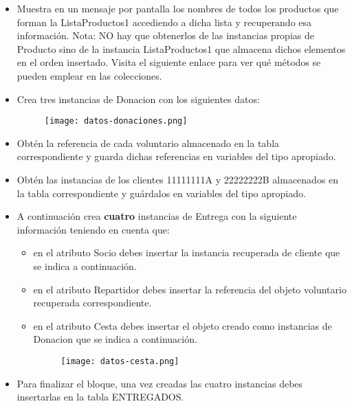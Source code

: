 \begin{enumerate}[label=\alph*)]
\begin{itemize}
        \item Muestra en un mensaje por pantalla los nombres de todos los productos que forman la ListaProductos1 accediendo a dicha lista y recuperando esa información. Nota: NO hay que obtenerlos de las instancias propias de Producto sino de la instancia ListaProductos1 que almacena dichos elementos en el orden insertado. Visita el siguiente enlace para ver qué métodos se pueden emplear en las colecciones.

        \item Crea tres instancias de Donacion con los siguientes datos:

    \begin{figure}[H]
    \centering
    \texttt{[image: datos-donaciones.png]}
    \end{figure}

    \item Obtén la referencia de cada voluntario almacenado en la tabla correspondiente y guarda dichas referencias en variables del tipo apropiado.
    \item Obtén las instancias de los clientes 11111111A y 22222222B almacenados en la tabla correspondiente y guárdalos en variables del tipo apropiado.
    \item A continuación crea \textbf{cuatro} instancias de Entrega con la siguiente información teniendo en cuenta que:
    \begin{itemize}
        \item en el atributo  Socio debes insertar la instancia recuperada de cliente que se indica a continuación.
        \item en el atributo Repartidor debes insertar la referencia del objeto voluntario recuperada correspondiente.
        \item en el atributo Cesta debes insertar el objeto creado como instancias de Donacion que se indica a continuación.

        \begin{figure}[H]
            \centering
            \texttt{[image: datos-cesta.png]}
        \end{figure}
    \end{itemize}

      \item Para finalizar el bloque, una vez creadas las cuatro instancias debes insertarlas en la tabla ENTREGADOS.
    \end{itemize}
\end{enumerate}

